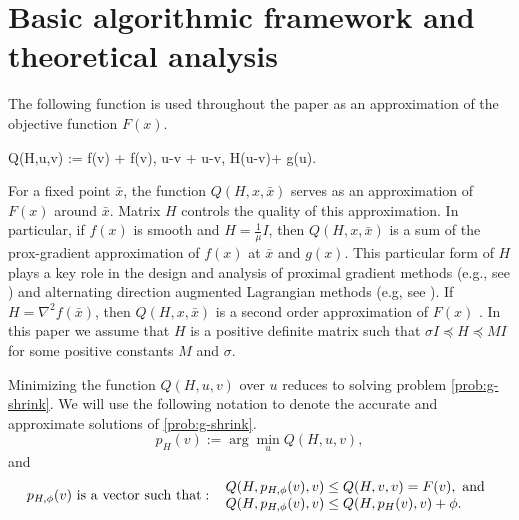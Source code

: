 \documentclass[11pt]{article}
\numberwithin{equation}{section}
\begin{document}





\section{Basic algorithmic framework and theoretical analysis}\label{sec:basic} 

The following function is used throughout the paper as an approximation of the objective function $F(x)$.

\bea \label{def-Qf}
Q(H,u,v) := f(v) +
\langle \nabla f(v),  u-v \rangle +  \langle u-v, H(u-v)\rangle + g(u).
\eea 


%
For a fixed point $\bar x$, the function $Q(H,  x, \bar x)$ serves as an approximation of $F(x)$ around  $\bar x$. 
Matrix $H$ controls the quality of this approximation. In particular, if $f(x)$ is smooth  and  $H=\frac{1}{\mu}I$, then $Q(H, x , \bar x)$ is a sum of the prox-gradient approximation of $f(x)$ at $\bar x$ and $g(x)$. This particular form of $H$ plays a key role in the design and analysis of proximal gradient methods (e.g., see  \cite{Beck2009}) 
and alternating direction augmented Lagrangian methods (e.g, see \cite{Alm_Scheinberg}).
 If  $H=\nabla^2 f(\bar x)$, then  $Q(H, x ,\bar x)$
is a second order approximation of $F(x)$  \cite{Saundersetal, SchmidtQP}.
In this paper we assume that  $H$ is a positive definite matrix such that $\sigma I \preceq H\preceq M I$ for some positive constants $M$ and $\sigma$. 

Minimizing the function $Q(H, u,v)$ over $u$ reduces to solving problem \eqref{prob:g-shrink}. We will use the following notation to denote the accurate and approximate solutions of \eqref{prob:g-shrink}.
\begin{equation}\label{eq:pv}
p_H(v):=\arg\min_u Q(H, u,v),  
\end{equation}
and 
\begin{equation}\label{eq:pvphi}
p_{H, \phi}(v) {\rm \ is \ a\ vector\ such\ that:\ } \  \begin{array}{l}  Q(H, p_{H, \phi}(v),v)\leq Q(H, v,v)=F(v),\ {\rm and }\\
Q(H, p_{H, \phi}(v),v)\leq Q(H, p_{H}(v),v)+\phi. \end{array}
\end{equation}
\end{document}

